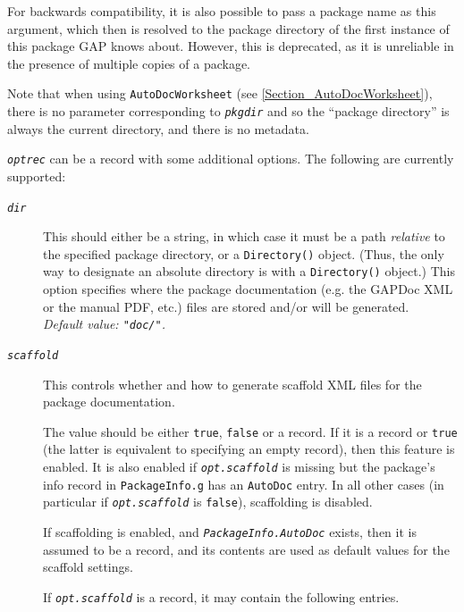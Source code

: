 \documentclass[a4paper,11pt]{report}
\begin{document}
{{{\begin{description}
 For backwards compatibility, it is also possible to pass a package name as
this argument, which then is resolved to the package directory of the first
instance of this package \textsf{GAP} knows about. However, this is deprecated, as it is unreliable in the presence
of multiple copies of a package. 

 Note that when using \texttt{AutoDocWorksheet} (see \ref{Section_AutoDocWorksheet}), there is no parameter corresponding to \mbox{\texttt{\mdseries\slshape pkgdir}} and so the ``package directory'' is always the current directory, and there is no metadata. 
\item[{\mbox{\texttt{\mdseries\slshape optrec}}}]  \mbox{\texttt{\mdseries\slshape optrec}} can be a record with some additional options. The following are currently
supported: 
\begin{description}
\item[{\mbox{\texttt{\mdseries\slshape dir}}}]  This should either be a string, in which case it must be a path \emph{relative} to the specified package directory, or a \texttt{Directory()} object. (Thus, the only way to designate an absolute directory is with a \texttt{Directory()} object.) This option specifies where the package documentation (e.g. the \textsf{GAPDoc} XML or the manual PDF, etc.) files are stored and/or will be generated. \\
 \emph{Default value: \texttt{"doc/"}.} 
\item[{\mbox{\texttt{\mdseries\slshape scaffold}}}]  This controls whether and how to generate scaffold XML files for the package
documentation. 

 The value should be either \texttt{true}, \texttt{false} or a record. If it is a record or \texttt{true} (the latter is equivalent to specifying an empty record), then this feature is
enabled. It is also enabled if \mbox{\texttt{\mdseries\slshape opt.scaffold}} is missing but the package's info record in \texttt{PackageInfo.g} has an \texttt{AutoDoc} entry. In all other cases (in particular if \mbox{\texttt{\mdseries\slshape opt.scaffold}} is \texttt{false}), scaffolding is disabled. 

 If scaffolding is enabled, and \mbox{\texttt{\mdseries\slshape PackageInfo.AutoDoc}} exists, then it is assumed to be a record, and its contents are used as
default values for the scaffold settings. 

 

 If \mbox{\texttt{\mdseries\slshape opt.scaffold}} is a record, it may contain the following entries. 


\end{description}
\end{description}}}}
\end{document}
